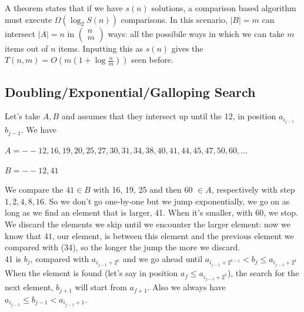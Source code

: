 \documentclass[10pt]{report}
\begin{document}
A theorem states that if we have $s(n)$ solutions, a comparison based algorithm must execute $\Omega(\log_2 S(n))$ comparisons. In this scenario, $|B| = m$ can intersect $|A| = n$ in $\left(\begin{array}{c}
n\\m
\end{array}\right)$ ways: all the possibile ways in which we can take $m$ items out of $n$ items. Inputting this as $s(n)$ gives the $T(n, m) = O(m(1 + \log\frac{n}{m}))$ seen before.
\subsection{Doubling/Exponential/Galloping Search} Let's take $A, B$ and assumes that they intersect up until the 12, in position $a_{i_{j-1}}$ $b_{j-1}$. We have
\begin{list}{}{}
	\item $A = -- 12, 16, 19, 20, 25, 27, 30, 31, 34, 38, 40, 41, 44, 45, 47, 50, 60,\ldots$
	\item $B = -- 12, 41$
\end{list}
We compare the $41\in B$ with 16, 19, 25 and then 60 $\in A$, respectively with step $1, 2, 4, 8, 16$. So we don't go one-by-one but we jump exponentially, we go on as long as we find an element that is larger, 41. When it's smaller, with 60, we stop. We discard the elements we skip until we encounter the larger element: now we know that $41$, our element, is between this element and the previous element we compared with (34), so the longer the jump the more we discard.\\
41 is $b_j$, compared with $a_{i_{j-1} + 2^k}$ and we go ahead until $a_{i_{j-1} + 2^{k-1}} < b_j \leq a_{i_{j-1} + 2^k}$\\
When the element is found (let's say in position $a_f \leq a_{i_{j-1} + 2^k}$), the search for the next element, $b_{j+1}$ will start from $a_{f+1}$. Also we always have $a_{i_{j-1}} \leq b_{j-1} < a_{i_{j-1} +1}$.
\end{document}

